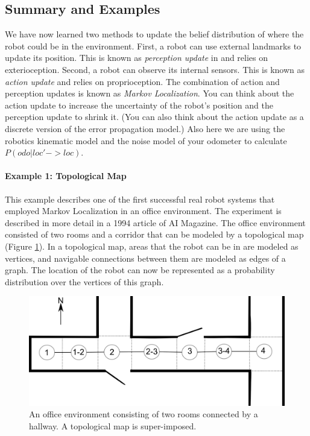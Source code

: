 \subsection{Summary and Examples}
We have now learned two methods to update the belief distribution of where the robot could be in the environment. First, a robot can use external landmarks to update its position. This is known as \emph{perception update} in  and relies on exterioception. Second, a robot can observe its internal sensors. This is known as \emph{action update} and relies on proprioception. The combination of action and perception updates is known as \emph{Markov Localization}. You can think about the action update to increase the uncertainty of the robot's position and the perception update to shrink it. (You can also think about the action update as a discrete version of the error propagation model.) Also here we are using the robotics kinematic model and the noise model of your odometer to calculate $ P(odo|loc'->loc)$.

\paragraph{Example 1: Topological Map}
This example describes one of the first successful real robot systems that employed Markov Localization in an office environment. The experiment is described in more detail in a 1994 article of AI Magazine. The office environment consisted of two rooms and a corridor that can be modeled by a topological map (Figure \ref{fig:dervish_example}). In a topological map, areas that the robot can be in are modeled as vertices, and navigable connections between them are modeled as edges of a graph. The location of the robot can now be represented as a probability distribution over the vertices of  this graph.

\begin{figure}
	\centering
		\includegraphics[width=\textwidth]{figs/dervish_example}
	\caption{An office environment consisting of two rooms connected by a hallway. A topological map is super-imposed.}
	\label{fig:dervish_example}
\end{figure}

